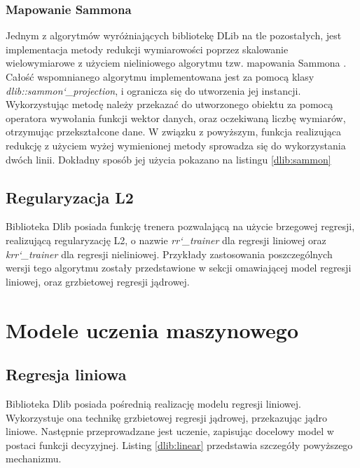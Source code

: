 
\subsubsection{Mapowanie Sammona}

Jednym z algorytmów wyróżniających bibliotekę DLib na tle pozostałych, jest implementacja metody redukcji wymiarowości poprzez skalowanie wielowymiarowe z użyciem nieliniowego algorytmu tzw. mapowania Sammona \cite{sammon}. Całość wspomnianego algorytmu implementowana jest za pomocą klasy \textit{dlib::sammon\char`_projection}, i ogranicza się do utworzenia jej instancji. Wykorzystując metodę należy przekazać do utworzonego obiektu za pomocą operatora wywołania funkcji wektor danych, oraz oczekiwaną liczbę wymiarów, otrzymując przekształcone dane. W związku z powyższym, funkcja realizująca redukcję z użyciem wyżej wymienionej metody sprowadza się do wykorzystania dwóch linii. Dokładny sposób jej użycia pokazano na listingu \ref{dlib:sammon}


\subsection{Regularyzacja L2}

Biblioteka Dlib posiada funkcję trenera pozwalającą na użycie brzegowej regresji, realizującą regularyzację L2, o nazwie \textit{rr\char`_trainer} dla regresji liniowej oraz \textit{krr\char`_trainer} dla regresji nieliniowej. Przykłady zastosowania poszczególnych wersji tego algorytmu zostały przedstawione w sekcji omawiającej model regresji liniowej, oraz grzbietowej regresji jądrowej.

\section{Modele uczenia maszynowego}

\subsection{Regresja liniowa}
Biblioteka Dlib posiada pośrednią realizację modelu regresji liniowej. Wykorzystuje ona technikę grzbietowej regresji jądrowej, przekazując jądro liniowe. Następnie przeprowadzane jest uczenie, zapisując docelowy model w postaci funkcji decyzyjnej. Listing \ref{dlib:linear} przedstawia szczegóły powyższego mechanizmu.

